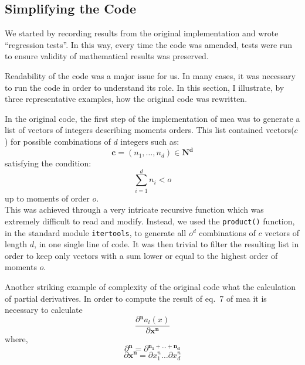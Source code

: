  
\subsection{Simplifying the Code}
We started by recording results from the original implementation and wrote ``regression tests''.
In this way, every time the code was amended, tests were run to ensure validity of mathematical results was preserved.


Readability of the code was a major issue for us.
In many cases, it was necessary to run the code in order to understand its role.
In this section, I illustrate, by three representative examples, how the original code was rewritten.

In the original code, the first step of the implementation of \acrshort{mea} was to generate a list of vectors of integers describing moments orders.
This list contained vectors($c$) for possible combinations of $d$ integers such as:\\
\[\mathbf{c} =(n_1, \dots, n_d) \in \mathbf{N^d}\]
satisfying the condition:\\
\[\sum_{i=1}^{d} n_i < o\]
up to moments of order $o$.\\

This was achieved through a very intricate recursive function which was extremely difficult to read and modify.
Instead, we used the \texttt{product()} function, in the standard module \texttt{itertools},
to generate all $o^d$ combinations of $c$ vectors of length  $d$, in one single line of code.
It was then trivial to filter the resulting list in order to keep only vectors with a sum lower or equal to the highest order of moments $o$.

Another striking example of complexity of the original code what the calculation of partial derivatives.
In order to compute the result of eq.~7 of \gls{mea}\cite{ale_general_2013} it is necessary to calculate\\
\[\frac{\partial{}^\mathbf{n} a_l(x)}{\partial{}\mathbf{x^n}}\]
where,\\
\[\partial{}^\mathbf{n} = \partial{}^\mathbf{n_1+\dots{}+n_d}\]
\[\partial{} \mathbf{x^n} = \partial{} x^n_1 \dots{} \partial x^n_d\]

